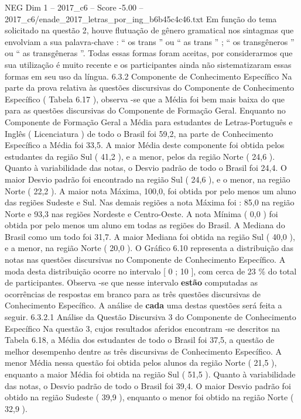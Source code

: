 \begin{textsample}{NEG Dim 1 – 2017\_c6 – Score -5.00 – 2017\_c6/enade\_2017\_letras\_por\_ing\_b6b45c4c46.txt}
Em função do tema solicitado na questão 2, houve flutuação de gênero gramatical nos sintagmas que envolviam a sua palavra-chave : “ os trans ” ou “ as trans ” ; “ os transgêneros ” ou “ as transgêneras ”.
Todas essas formas foram aceitas, por considerarmos que sua utilização é muito recente e os participantes ainda não sistematizaram essas formas em seu uso da língua. 6.3.2 Componente de Conhecimento Específico Na parte da prova relativa às questões discursivas do Componente de Conhecimento Específico ( Tabela 6.17 ), observa -se que a Média foi bem mais baixa do que para as questões discursivas do Componente de Formação Geral.
Enquanto no Componente de Formação Geral a Média para estudantes de Letras-Português e Inglês ( Licenciatura ) de todo o Brasil foi 59,2, na parte de Conhecimento Específico a Média foi 33,5.
A maior Média deste componente foi obtida pelos estudantes da região Sul ( 41,2 ), e a menor, pelos da região Norte ( 24,6 ).
Quanto à variabilidade das notas, o Desvio padrão de todo o Brasil foi 24,4.
O maior Desvio padrão foi encontrado na região Sul ( 24,6 ), e o menor, na região Norte ( 22,2 ).
A maior nota Máxima, 100,0, foi obtida por pelo menos um aluno das regiões Sudeste e Sul.
Nas demais regiões a nota Máxima foi : 85,0 na região Norte e 93,3 nas regiões Nordeste e Centro-Oeste.
A nota Mínima ( 0,0 ) foi obtida por pelo menos um aluno em todas as regiões do Brasil.
A Mediana do Brasil como um todo foi 31,7.
A maior Mediana foi obtida na região Sul ( 40,0 ), e a menor, na região Norte ( 20,0 ).
O Gráfico 6.10 representa a distribuição das notas nas questões discursivas no Componente de Conhecimento Específico.
A moda desta distribuição ocorre no intervalo [ 0 ; 10 ], com cerca de 23 \% do total de participantes.
Observa -se que nesse intervalo \textbf{estão} computadas as ocorrências de respostas em branco para as três questões discursivas de Conhecimento Específico.
A análise de \textbf{cada} uma destas questões será feita a seguir. 6.3.2.1 Análise da Questão Discursiva 3 do Componente de Conhecimento Específico Na questão 3, cujos resultados aferidos encontram -se descritos na Tabela 6.18, a Média dos estudantes de todo o Brasil foi 37,5, a questão de melhor desempenho dentre as três discursivas de Conhecimento Específico.
A menor Média nessa questão foi obtida pelos alunos da região Norte ( 21,5 ), enquanto a maior Média foi obtida na região Sul ( 51,5 ).
Quanto à variabilidade das notas, o Desvio padrão de todo o Brasil foi 39,4.
O maior Desvio padrão foi obtido na região Sudeste ( 39,9 ), enquanto o menor foi obtido na região Norte ( 32,9 ).

\end{textsample}
